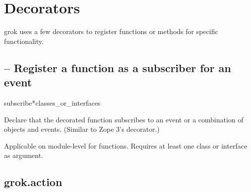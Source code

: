 \chapter{Decorators}

grok uses a few decorators to register functions or methods for specific
functionality.

    \section{ -- Register a function as a subscriber
    for an event}


        \begin{funcdesc}{subscribe}{*classes_or_interfaces}

        Declare that the decorated function subscribes to an event or a
        combination of objects and events. (Similar to Zope 3's
         decorator.)

        Applicable on module-level for functions. Requires at least one class
        or interface as argument.

        \end{funcdesc}


    \section{grok.action}

